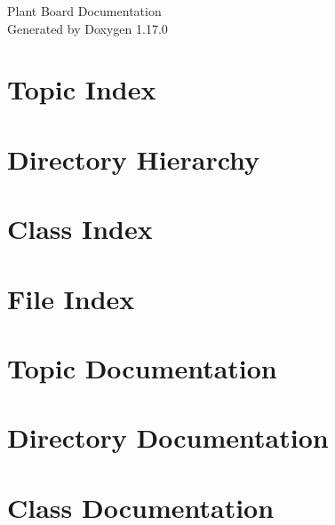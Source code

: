 \documentclass[twoside]{book}
\newcommand{\+}{\discretionary{\mbox{\scriptsize$\hookleftarrow$}}{}{}}
\newcommand{\clearemptydoublepage}{%
    \newpage{\pagestyle{empty}\cleardoublepage}%
  }
\begin{document}
  \raggedbottom
    \hypersetup{pageanchor=false,
                bookmarksnumbered=true,
                pdfencoding=unicode
               }
  \begin{titlepage}
  \vspace*{7cm}
  \begin{center}%
  {\Large Plant Board Documentation}\\
  \vspace*{1cm}
  {\large Generated by Doxygen 1.17.0}\\
  \end{center}
  \end{titlepage}
  \clearemptydoublepage
  \tableofcontents
  \clearemptydoublepage
  \hypersetup{pageanchor=true}

\chapter{Topic Index}

\chapter{Directory Hierarchy}

\chapter{Class Index}

\chapter{File Index}

\chapter{Topic Documentation}

\chapter{Directory Documentation}





\chapter{Class Documentation}




\end{document}
